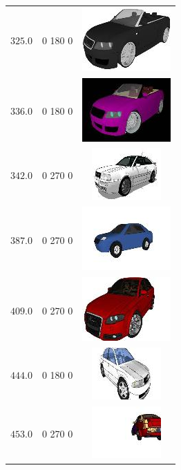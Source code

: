 \begin{longtable}{ccc}
	$325.0$ & 0 180 0 & \includegraphics{models/e73aae2429a5a82f6e18fb26dae93462.jpg}\\
	$336.0$ & 0 180 0 & \includegraphics{models/71087df2e2cad8ff226bada6582f702c.jpg}\\
	$342.0$ & 0 270 0 & \includegraphics{models/71d42a00962f5083c1bbb501b1d87871.jpg}\\
	$387.0$ & 0 270 0 & \includegraphics{models/3d4d143467ba0f94979a4630b9b23d8d.jpg}\\
	$409.0$ & 0 270 0 & \includegraphics{models/b808f6aa8fdc9fef9f0172d2e273dee8.jpg}\\
	$444.0$ & 0 180 0 & \includegraphics{models/7076464b3733aa38d2c2bfa672ed621f.jpg}\\
	$453.0$ & 0 270 0 & \includegraphics{models/a296d440b459ea9b2de16d8ea9964833.jpg}\\

\end{longtable}
